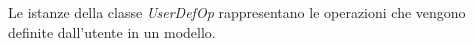 
Le istanze della classe \textit{UserDefOp} rappresentano le operazioni che vengono definite dall'utente in un modello.